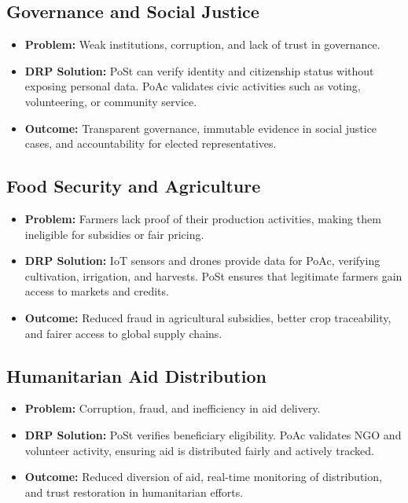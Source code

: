 \documentclass[11pt,a4paper]{article}
\begin{document}
\subsection{Governance and Social Justice}
\begin{itemize}
    \item \textbf{Problem:} Weak institutions, corruption, and lack of trust in governance.
    \item \textbf{DRP Solution:} PoSt can verify identity and citizenship status without exposing personal data. PoAc validates civic activities such as voting, volunteering, or community service.
    \item \textbf{Outcome:} Transparent governance, immutable evidence in social justice cases, and accountability for elected representatives.
\end{itemize}

\subsection{Food Security and Agriculture}
\begin{itemize}
    \item \textbf{Problem:} Farmers lack proof of their production activities, making them ineligible for subsidies or fair pricing.
    \item \textbf{DRP Solution:} IoT sensors and drones provide data for PoAc, verifying cultivation, irrigation, and harvests. PoSt ensures that legitimate farmers gain access to markets and credits.
    \item \textbf{Outcome:} Reduced fraud in agricultural subsidies, better crop traceability, and fairer access to global supply chains.
\end{itemize}

\subsection{Humanitarian Aid Distribution}
\begin{itemize}
    \item \textbf{Problem:} Corruption, fraud, and inefficiency in aid delivery.
    \item \textbf{DRP Solution:} PoSt verifies beneficiary eligibility. PoAc validates NGO and volunteer activity, ensuring aid is distributed fairly and actively tracked.
    \item \textbf{Outcome:} Reduced diversion of aid, real-time monitoring of distribution, and trust restoration in humanitarian efforts.
\end{itemize}
\end{document}
